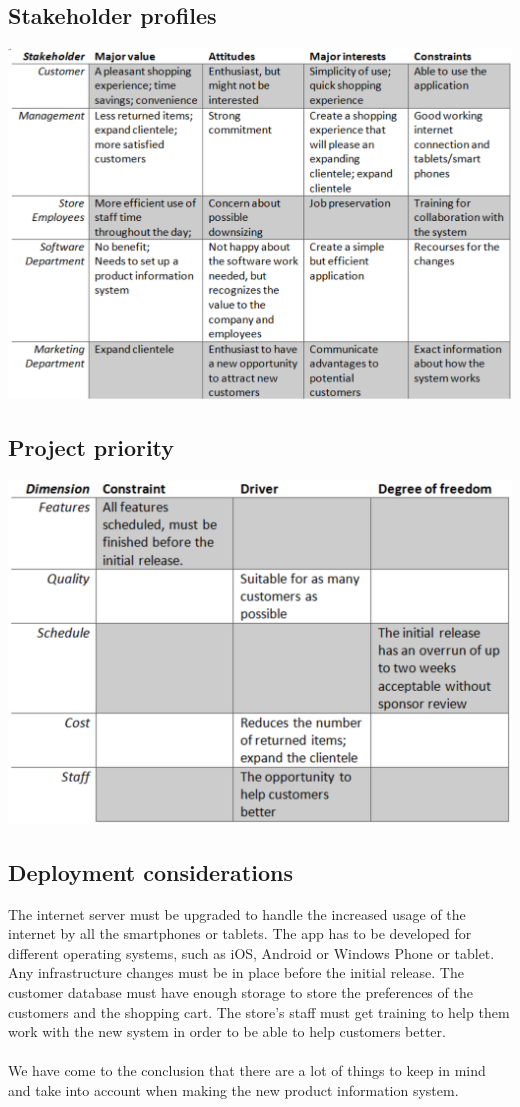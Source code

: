 \documentclass[a4paper]{article}
\begin{document}
\subsection*{Stakeholder profiles}
\includegraphics[scale=0.7]{stakeholder_profiles.eps}

\subsection*{Project priority}
\includegraphics[scale=0.8]{project_priority.eps}

\subsection*{Deployment considerations}
The internet server must be upgraded to handle the increased usage of the internet by all the smartphones or tablets. The app has to be developed for different operating systems, such as iOS, Android or Windows Phone or tablet. Any infrastructure changes must be in place before the initial release. The customer database must have enough storage to store the preferences of the customers and the shopping cart. The store’s staff must get training to help them work with the new system in order to be able to help customers better.\\
\\
We have come to the conclusion that there are a lot of things to keep in mind and take into account when making the new product information system. 
\end{document}
